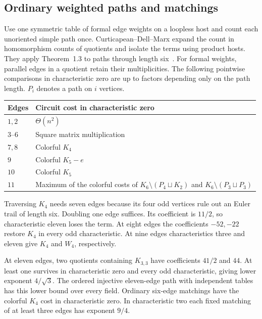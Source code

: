 \documentclass[11pt,letterpaper]{article}
\begin{document}
\subsection{Ordinary weighted paths and matchings}

Use one symmetric table of formal edge weights on a loopless host and count
each unoriented simple path once. Curticapean--Dell--Marx expand the count
in homomorphism counts of quotients and isolate the terms using product hosts.
They apply Theorem~1.3 to paths through length six~\cite[p.~3 of the full version]{cdm}. For formal weights,
parallel edges in a quotient retain their multiplicities. The following
pointwise comparisons in characteristic zero are up to factors depending only
on the path length. \(P_i\) denotes a path on \(i\) vertices.

\begin{center}
\begin{tabularx}{\linewidth}{@{}lX@{}}
\toprule Edges & Circuit cost in characteristic zero\\ \midrule
\(1,2\) & \(\Theta(n^2)\)\\
\(3\)--\(6\) & Square matrix multiplication\\
\(7,8\) & Colorful \(K_4\)\\
\(9\) & Colorful \(K_5-e\)\\
\(10\) & Colorful \(K_5\)\\
\(11\) & Maximum of the colorful costs of \(K_6\setminus(P_4\sqcup K_2)\) and \(K_6\setminus(P_3\sqcup P_3)\)\\
\bottomrule
\end{tabularx}
\end{center}

Traversing \(K_4\) needs seven edges because its four odd vertices rule out
an Euler trail of length six. Doubling one edge suffices. Its coefficient
is \(11/2\), so characteristic eleven loses the term. At eight edges the
coefficients \(-52,-22\) restore \(K_4\) in every odd characteristic.
At nine edges characteristics three and eleven give \(K_4\) and \(W_4\), respectively.

At eleven edges, two quotients containing \(K_{3,3}\) have coefficients
\(41/2\) and \(44\). At least one survives in characteristic zero and every odd
characteristic, giving lower exponent \(4/\sqrt3\). The ordered injective
eleven-edge path with independent tables has this lower bound over every field.
Ordinary six-edge matchings have the colorful \(K_4\) cost in characteristic
zero. In characteristic two each fixed matching of at least three edges has
exponent \(9/4\).
\end{document}
